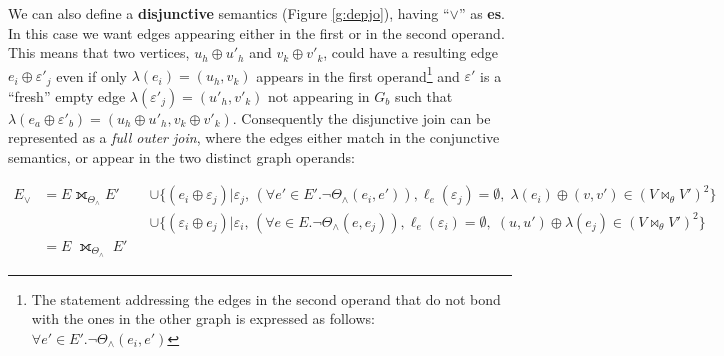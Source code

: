 We can also define a \textbf{disjunctive} semantics (Figure \ref{g:depjo}), having ``$\vee$'' as \textbf{es}.
In this case we want edges appearing either in the first or in the second operand.
This means that two vertices, $u_h\oplus u'_h$ and $v_k\oplus v'_k$, {{could}} have a resulting
edge
$e_i\oplus \varepsilon'_j$
even if only $\lambda(e_i)=(u_h,v_k)$ appears in the first operand\footnote{The statement addressing the edges in the second operand that do not bond with the ones in the other graph is expressed as follows: $\forall e'\in E'. \neg\Theta_\wedge(e_i,e')$}
and $\varepsilon'$ is a ``fresh'' empty edge $\lambda(\varepsilon'_j)=(u'_h,v'_k)$ not
appearing in $G_b$ such that $\lambda(e_a\oplus \varepsilon'_b)=(u_h\oplus u'_h,v_k\oplus v'_k)$.
Consequently the disjunctive join can be represented as a \textit{full outer join}, where the
edges either match in the conjunctive semantics, or appear in the two distinct graph operands:


\begin{align*}
E_{\vee}&=E\fullouterjoin_{\Theta_\wedge}E'&&\cup\{(e_i\oplus\varepsilon_j)|\varepsilon_j,\,\left(\forall e'\in E'. \neg\Theta_\wedge(e_i,e')\right), \ell_e(\varepsilon_j)=\emptyset,\;\lambda(e_i)\oplus (v,v')\in (V\bowtie_\theta V')^2  \}\\
& && \cup\{(\varepsilon_i\oplus e_j)|\varepsilon_i,\,\left(\forall e\in E. \neg\Theta_\wedge(e,e_j)\right), \ell_e(\varepsilon_i)=\emptyset,\;(u,u')\oplus \lambda(e_j)\in (V\bowtie_\theta V')^2  \}\quad \\
&=  E\;\fullouterjoin_{\Theta_\wedge}\;E'
\end{align*}

